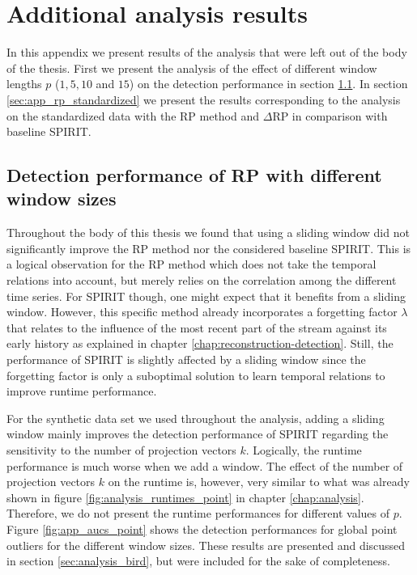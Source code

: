 \chapter{Additional analysis results}
\label{app:analysis}

In this appendix we present results of the analysis that were left out of the body of the thesis. First we present the analysis of the effect of different window lengths $p$ ($1,5,10$ and $15$) on the detection performance in section \ref{sec:app_windowsizes}. In section \ref{sec:app_rp_standardized} we present the results corresponding to the analysis on the standardized data with the RP method and $\Delta$RP in comparison with baseline SPIRIT.

\section{Detection performance of RP with different window sizes}
\label{sec:app_windowsizes}
Throughout the body of this thesis we found that using a sliding window did not significantly improve the RP method nor the considered baseline SPIRIT. This is a logical observation for the RP method which does not take the temporal relations into account, but merely relies on the correlation among the different time series. For SPIRIT though, one might expect that it benefits from a sliding window. However, this specific method already incorporates a forgetting factor $\lambda$ that relates to the influence of the most recent part of the stream against its early history as explained in chapter \ref{chap:reconstruction-detection}. Still, the performance of SPIRIT is slightly affected by a sliding window since the forgetting factor is only a suboptimal solution to learn temporal relations to improve runtime performance. 

For the synthetic data set we used throughout the analysis, adding a sliding window mainly improves the detection performance of SPIRIT regarding the sensitivity to the number of projection vectors $k$. Logically, the runtime performance is much worse when we add a window. The effect of the number of projection vectors $k$ on the runtime is, however, very similar to what was already shown in figure \ref{fig:analysis_runtimes_point} in chapter \ref{chap:analysis}. Therefore, we do not present the runtime performances for different values of $p$.
Figure \ref{fig:app_aucs_point} shows the detection performances for global point outliers for the different window sizes. These results are presented and discussed in section \ref{sec:analysis_bird}, but were included for the sake of completeness.

